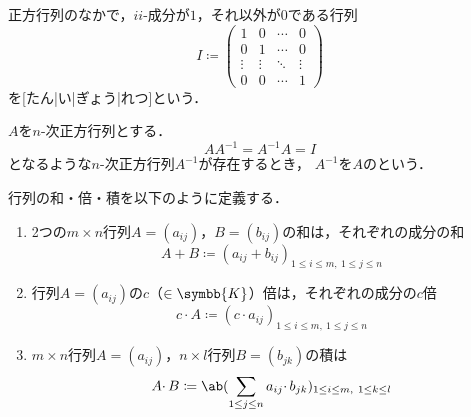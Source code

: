 \documentclass[../sotsu.tex]{subfiles}
\begin{document}
\begin{definition}
    正方行列のなかで，$ii$-成分が$1$，それ以外が$0$である行列
    \begin{equation}
        I \coloneq 
        \begin{pmatrix}
            1  &  0  &  \cdots  &  0  \\
            0  &  1  &  \cdots  &  0  \\
            \vdots & \vdots & \ddots & \vdots \\
            0  &  0  &  \cdots  &  1  
        \end{pmatrix}
    \end{equation}
    を[たん|い|ぎょう|れつ]という．
\end{definition}

\begin{definition}
    \label{dfn:inverse-of-matrix}
    $A$を$n$-次正方行列とする．
    \begin{equation}
        A A^{-1} = A^{-1} A = I
    \end{equation}
    となるような$n$-次正方行列$A^{-1}$が存在するとき，
    $A^{-1}$を$A$のという．
\end{definition}


\begin{definition}
    行列の和・倍・積を以下のように定義する．
    \begin{enumerate}
        \item 2つの$m \times n$行列$A = (a_{ij})$，$B = (b_{ij})$の和は，それぞれの成分の和
            \begin{equation}
                A + B \coloneq (a_{ij} + b_{ij})_{1 \leq i \leq m, \  1 \leq j \leq n}
            \end{equation}
        \item 行列$A = (a_{ij})$の$c$（$\in \symbb{K}$）倍は，それぞれの成分の$c$倍
            \begin{equation}
                c \cdotp A \coloneq (c \cdotp a_{ij})_{1 \leq i \leq m, \  1 \leq j \leq n}
            \end{equation}
        \item $m \times n$行列$A = (a_{ij})$，$n \times l$行列$B = (b_{jk})$の積は
            \begin{equation}
                A \cdotp B \coloneq \ab( \sum_{1 \leq j \leq n} a_{ij} \cdotp b_{jk} )_{1 \leq i \leq m, \  1 \leq k \leq l}
            \end{equation}
    \end{enumerate}
\end{definition}
\end{document}
